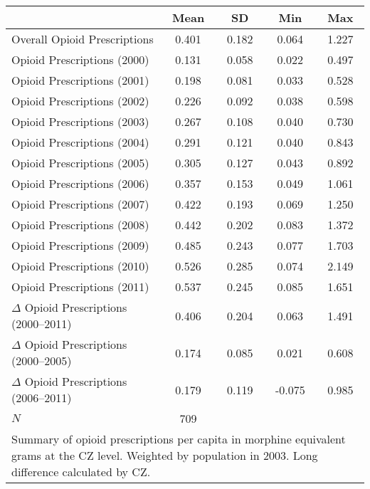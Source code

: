 {
\def\sym#1{\ifmmode^{#1}\else\(^{#1}\)\fi}
\begin{tabular}{l*{1}{cccc}}
\hline\hline
            &        Mean&          SD&         Min&         Max\\
\hline
Overall Opioid Prescriptions&       0.401&       0.182&       0.064&       1.227\\
Opioid Prescriptions (2000)&       0.131&       0.058&       0.022&       0.497\\
Opioid Prescriptions (2001)&       0.198&       0.081&       0.033&       0.528\\
Opioid Prescriptions (2002)&       0.226&       0.092&       0.038&       0.598\\
Opioid Prescriptions (2003)&       0.267&       0.108&       0.040&       0.730\\
Opioid Prescriptions (2004)&       0.291&       0.121&       0.040&       0.843\\
Opioid Prescriptions (2005)&       0.305&       0.127&       0.043&       0.892\\
Opioid Prescriptions (2006)&       0.357&       0.153&       0.049&       1.061\\
Opioid Prescriptions (2007)&       0.422&       0.193&       0.069&       1.250\\
Opioid Prescriptions (2008)&       0.442&       0.202&       0.083&       1.372\\
Opioid Prescriptions (2009)&       0.485&       0.243&       0.077&       1.703\\
Opioid Prescriptions (2010)&       0.526&       0.285&       0.074&       2.149\\
Opioid Prescriptions (2011)&       0.537&       0.245&       0.085&       1.651\\
$\Delta$ Opioid Prescriptions (2000--2011)&       0.406&       0.204&       0.063&       1.491\\
$\Delta$ Opioid Prescriptions (2000--2005)&       0.174&       0.085&       0.021&       0.608\\
$\Delta$ Opioid Prescriptions (2006--2011)&       0.179&       0.119&      -0.075&       0.985\\
\hline
\(N\)       &         709&            &            &            \\
\hline\hline
\multicolumn{5}{p{0.65\textwidth}}{Summary of opioid prescriptions per capita in morphine equivalent grams at the CZ level.  Weighted by population in 2003.  Long difference calculated by CZ.}
\end{tabular}
}
